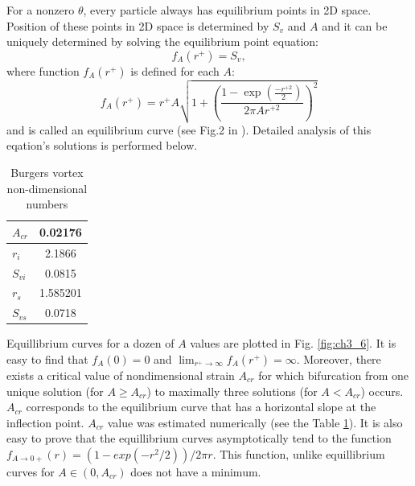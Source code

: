 \documentclass[../main.tex]{subfiles}
\begin{document}
For a nonzero $\theta$, every particle always has equilibrium points in 2D space. Position of these points in 2D space is determined by $S_v$ and $A$ and it can be uniquely determined by solving the equilibrium point equation:
\begin{equation}
 f_A(r^+) = S_v,
 \label{ch3:eq27}
\end{equation}
where function $f_A(r^+)$ is defined for each $A$:
\begin{equation}
f_A(r^+) = r^+ A \sqrt { 1 + \left( \frac{1-\exp \left(\frac{-r^{+ 2}}{2}\right)}{2\pi Ar^{+ 2}} \right)^2 }
 \label{ch3:eq28}
\end{equation}
and is called an equilibrium curve (see Fig.2 in \citet{Marcu1995}). Detailed analysis of this eqation's solutions is performed below.\\

\begin{table}
\small
\tabcolsep=0.2cm
\centering
\caption{Burgers vortex non-dimensional numbers}
\centering
\begin{tabular}{|l|c|}
\hline 
$A_{cr}$ & 0.02176 \\
\hline
$r_i$ & 2.1866\\
\hline
$S_{v i}$ & 0.0815\\
\hline
$r_s$ & 1.585201\\
\hline
$S_{v s}$ & 0.0718\\
\hline
\end{tabular}
\label{tab:ch3_2}
\end{table}

Equillibrium curves for a dozen of $A$ values are plotted in Fig. \ref{fig:ch3_6}. It is easy to find that $f_A(0)=0$ and $\lim_{r^+\to\infty} f_A(r^+)=\infty$. Moreover, there exists a critical value of nondimensional strain $A_{cr}$ for which bifurcation from one unique solution (for $A \geq A_{cr}$) to maximally three solutions (for $A<A_{cr}$) occurs. $A_{cr}$ corresponds to the equilibrium curve that has a horizontal slope at the inflection point. $A_{cr}$ value was estimated numerically (see the Table \ref{tab:ch3_2}). It is also easy to prove that the equillibrium curves asymptotically tend to the function $f_{A \rightarrow 0+}(r)=\left( 1-exp(-r^2/2)\right)/2\pi r$. This function, unlike equillibrium curves for $A \in (0,A_{cr})$ does not have a minimum.
\end{document}
